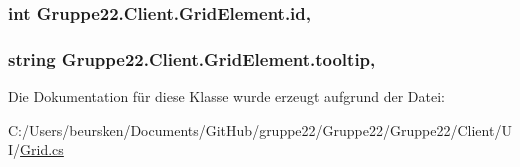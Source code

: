 \hypertarget{class_gruppe22_1_1_client_1_1_grid_element_ade695078dc93f47e1f5891408d65d7a7}{
\subsubsection[{id}]{\setlength{\rightskip}{0pt plus 5cm}int Gruppe22.\-Client.\-Grid\-Element.\-id\hspace{0.3cm}{\ttfamily [get]}, {\ttfamily [set]}}}\label{class_gruppe22_1_1_client_1_1_grid_element_ade695078dc93f47e1f5891408d65d7a7}
\hypertarget{class_gruppe22_1_1_client_1_1_grid_element_ae5630d8dff48a5516d96af9ce6da566f}{
\subsubsection[{tooltip}]{\setlength{\rightskip}{0pt plus 5cm}string Gruppe22.\-Client.\-Grid\-Element.\-tooltip\hspace{0.3cm}{\ttfamily [get]}, {\ttfamily [set]}}}\label{class_gruppe22_1_1_client_1_1_grid_element_ae5630d8dff48a5516d96af9ce6da566f}


Die Dokumentation für diese Klasse wurde erzeugt aufgrund der Datei\-:\begin{DoxyCompactItemize}
\item 
C\-:/\-Users/beursken/\-Documents/\-Git\-Hub/gruppe22/\-Gruppe22/\-Gruppe22/\-Client/\-U\-I/\hyperlink{_grid_8cs}{Grid.\-cs}\end{DoxyCompactItemize}
